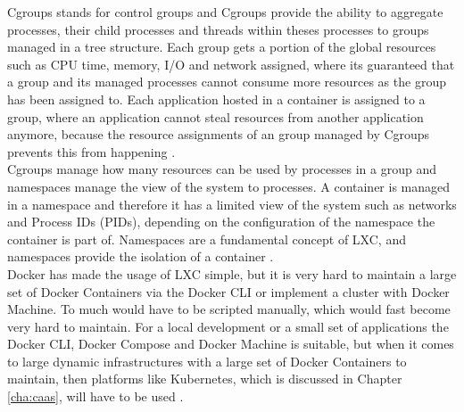 Cgroups stands for control groups and Cgroups provide the ability to aggregate processes, their child processes and threads within theses processes to groups managed in a tree structure. Each group gets a portion of the global resources such as CPU time, memory, I/O and network assigned, where its guaranteed that a group and its managed processes cannot consume more resources as the group has been assigned to. Each application hosted in a container is assigned to a group, where an application cannot steal resources from another application anymore, because the resource assignments of an group managed by Cgroups prevents this from happening \cite{KernelCGroupsV12018, KernelCGroupV22015, IntelLXCHyperVisor2014}. \\

Cgroups manage how many resources can be used by processes in a group and namespaces manage the view of the system to processes. A container is managed in a namespace and therefore it has a limited view of the system such as networks and Process IDs (PIDs), depending on the configuration of the namespace the container is part of. Namespaces are a fundamental concept of LXC, and namespaces provide the isolation of a container \cite{LinuxNamespaces2018, IntelLXCHyperVisor2014}. \\

Docker has made the usage of LXC simple, but it is very hard to maintain a large set of Docker Containers via the Docker CLI or implement a cluster with Docker Machine. To much would have to be scripted manually, which would fast become very hard to maintain. For a local development or a small set of applications the Docker CLI, Docker Compose and Docker Machine is suitable, but when it comes to large dynamic infrastructures with a large set of Docker Containers to maintain, then platforms like Kubernetes, which is discussed in Chapter \vref{cha:caas}, will have to be used \cite{DockerSwarm2018, CNCFKubernetes2018}. 
 

